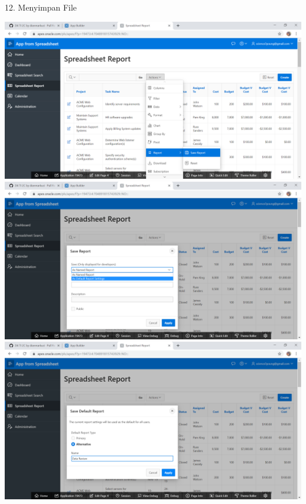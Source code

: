 \documentclass{article}
\begin{document}
\item 12. Menyimpan File
\begin{center}
    \includegraphics[width=10cm\textwidth]{figure/20.png}
    \includegraphics[width=10cm\textwidth]{figure/21.png}
    \includegraphics[width=10cm\textwidth]{figure/22.png}
\end{center}
\end{document}
